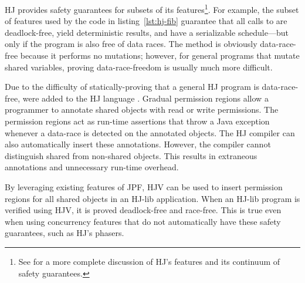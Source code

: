 HJ provides safety guarantees for subsets of its features\footnote{
See \cite{hj-overview} for a more complete discussion of HJ's features
and its continuum of safety guarantees.}.
For example, the subset of features used by the code in listing~\ref{lst:hj-fib}
guarantee that all calls to  are deadlock-free, yield deterministic
results, and have a serializable schedule---but only if the program is also free
of data races. The  method is obviously data-race-free because it
performs no mutations; however, for general programs that mutate shared variables,
proving data-race-freedom is usually much more difficult.

Due to the difficulty of statically-proving that a general HJ program is
data-race-free,  were added to the HJ
language \cite{hj-grad-perm}.
Gradual permission regions allow a programmer to annotate shared objects with
read or write permissions.
The permission regions act as run-time assertions that throw a Java exception
whenever a data-race is detected on the annotated objects.
The HJ compiler can also automatically insert these annotations.
However, the compiler cannot distinguish shared from non-shared objects.
This results in extraneous annotations and unnecessary run-time overhead.

By leveraging existing features of JPF, HJV can be used to insert permission
regions for all shared objects in an HJ-lib application.
When an HJ-lib program is verified using HJV, it is proved deadlock-free and
race-free.
This is true even when using concurrency features that do not automatically
have these safety guarantees, such as HJ's phasers.

